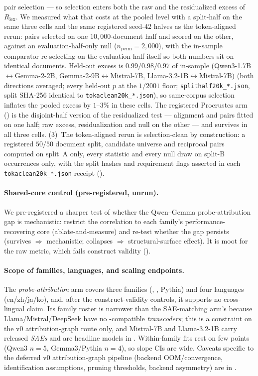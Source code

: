 pair selection --- so selection enters both the raw and the residualized excess of
$R_{\text{lex}}$. We measured what that costs at the pooled level with a split-half on the
same three cells and the same registered seed-$42$ halves as the token-aligned rerun:
pairs selected on one $10{,}000$-document half and scored on the other, against an
evaluation-half-only null ($n_{\text{perm}}{=}2{,}000$), with the in-sample comparator
re-selecting on the evaluation half itself so both numbers sit on identical documents.
Held-out excess is $0.99/0.98/0.97$ of in-sample (Qwen3-1.7B$\leftrightarrow$Gemma-2-2B,
Gemma-2-9B$\leftrightarrow$Mistral-7B, Llama-3.2-1B$\leftrightarrow$Mistral-7B) (both directions averaged; every held-out
$p$ at the $1/2001$ floor; \texttt{splithalf20k\_*.json}, split SHA-256 identical to
\texttt{tokaclean20k\_*.json}), so same-corpus selection inflates the pooled excess by
$1$--$3\%$ in these cells. The registered Procrustes arm () is the
disjoint-half version of the residualized test --- alignment and pairs fitted on one half;
raw excess, residualization and null on the other --- and survives in all three cells.
(3)~The token-aligned rerun is selection-clean by construction: a registered $50/50$
document split, candidate universe and reciprocal pairs computed on split~A only, every
statistic and every null draw on split-B occurrences only, with the split hashes and
requirement flags asserted in each \texttt{tokaclean20k\_*.json} receipt
().

\paragraph{Shared-core control (pre-registered, unrun).}
We pre-registered a sharper test of whether the Qwen--Gemma probe-attribution gap is
mechanistic: restrict the correlation to each family's performance-recovering core
(ablate-and-measure) and re-test whether the gap persists (survives $\Rightarrow$ mechanistic;
collapses $\Rightarrow$ structural-surface effect). It is moot for the raw metric, which fails
construct validity ().


\paragraph{Scope of families, languages, and scaling endpoints.} The
\emph{probe-attribution} arm covers three families
(\qwen{}, \gemma{}, Pythia) and four languages (en/zh/ja/ko), and, after the construct-validity controls, it supports no cross-lingual claim. Its family roster is narrower
than the SAE-matching arm's because Llama/Mistral/DeepSeek have no
\circuittracer{}-compatible \emph{transcoders}; this is a constraint on the v0
attribution-graph route only, and Mistral-7B and Llama-3.2-1B carry released
\emph{SAEs} and are headline models in .
Within-family fits rest on few points (Qwen3
$n{=}5$, Gemma3/Pythia $n{=}4$), so slope CIs are wide. Caveats specific to the deferred v0
attribution-graph pipeline (backend OOM/convergence, identification assumptions, pruning
thresholds, backend asymmetry) are in .


